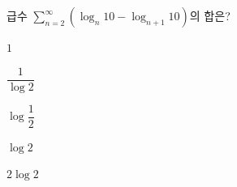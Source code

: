 급수 $\displaystyle\sum_{n=2}^{\infty}(\log_n 10-\log_{n+1}10)$의 합은?
\begin{choices32}{\rule[-3ex]{0pt}{8ex}$1$}{\rule[-3ex]{0pt}{8ex}$\dfrac{1}{\log 2}$}{\rule[-3ex]{0pt}{8ex}$\log\dfrac{1}{2}$}{\rule[-3ex]{0pt}{8ex}$\log 2$}{\rule[-3ex]{0pt}{8ex}$2\log 2$}\end{choices32}
